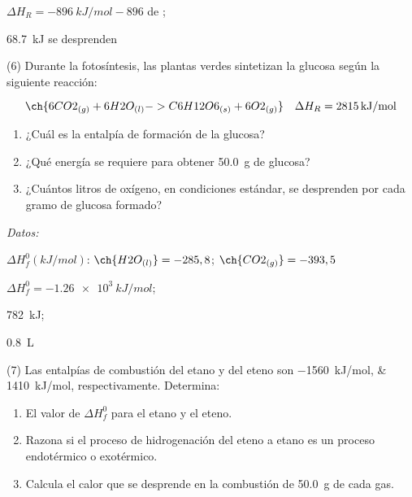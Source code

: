 \documentclass[10pt]{article}
\newenvironment{gexdatos}{
      \vspace{2pt}\noindent\textit{Datos: }
    }{\vspace{5pt}}
\begin{document}
\begin{multicols}{2}
\begin{solution}
  \begin{enumerate*}
    \item \( \Delta H_R = \SI{-896}{kJ/mol}-896 \) de ;
    \item \SI{68.7}{kJ} se desprenden
  \end{enumerate*}
\end{solution}




\begin{exercise}[
    tags    = {},
    topics  = {química, termodinámica, termoquímica},
    source  = {FQ 1B MGH 2016, p179, e6},
  ]
  (6) Durante la fotosíntesis, las plantas verdes sintetizan la glucosa
  según la siguiente reacción:

  \[ \ch{6 CO2_{(g)} + 6 H2O_{(l)} -> C6H12O6_{(s)} + 6 O2_{(g)}} \quad \Delta H_R = \SI{2815}{kJ/mol} \]

  \begin{enumerate}
    \item ¿Cuál es la entalpía de formación de la glucosa?
    \item ¿Qué energía se requiere para obtener \SI{50.0}{\gram} de glucosa?
    \item ¿Cuántos litros de oxígeno, en condiciones estándar, se desprenden por cada gramo de glucosa formado?
  \end{enumerate}

  \begin{gexdatos}
    \( \Delta H^0_f (\si{kJ/mol}) \): \( \ch{H2O_{(l)}} = -285,8 \); \( \ch    {CO2_{(g)}} = -393,5 \)
  \end{gexdatos}
\end{exercise}

\begin{solution}
  \begin{enumerate*}
    \item \( \Delta H^0_f = \SI{-1.26e3}{kJ/mol} \);
    \item \SI{782}{kJ};
    \item \SI{0.8}{\liter}
  \end{enumerate*}
\end{solution}




\begin{exercise}[
    tags    = {},
    topics  = {química, termodinámica, termoquímica},
    source  = {FQ 1B MGH 2016, p179, e7},
  ]
  (7) Las entalpías de combustión del etano y del eteno son
  \SIlist{-1560;1410}{kJ/mol}, respectivamente. Determina:
  \begin{enumerate}
    \item El valor de \( \Delta H^0_f \) para el etano y el eteno.
    \item Razona si el proceso de hidrogenación del eteno a etano
    es un proceso endotérmico o exotérmico.
    \item Calcula el calor que se desprende en la combustión de
    \SI{50.0}{\gram} de cada gas.
  \end{enumerate}


\end{exercise}
\end{multicols}
\end{document}
